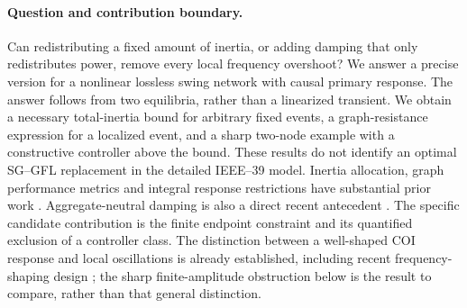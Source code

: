 \documentclass[11pt]{article}
\begin{document}
\paragraph{Question and contribution boundary.}
Can redistributing a fixed amount of inertia, or adding damping that only
redistributes power, remove every local frequency overshoot? We answer a
precise version for a nonlinear lossless swing network with causal primary
response. The answer follows from two equilibria, rather than a linearized
transient. We obtain a necessary total-inertia bound for arbitrary fixed
events, a graph-resistance expression for a localized event, and a sharp
two-node example with a constructive controller above the bound.
These results do not identify an optimal SG--GFL replacement in the detailed
IEEE--39 model. Inertia allocation, graph performance metrics and integral
response restrictions have substantial prior work
\cite{poollainertia,pagnier,malladamoments,aalipourmoments}.
Aggregate-neutral damping is also a direct recent antecedent
\cite{kohlhaas2026}. The specific candidate contribution is the finite
endpoint constraint and its quantified exclusion of a controller class.
The distinction between a well-shaped COI response and local oscillations
is already established, including recent frequency-shaping design
\cite{jiangfs}; the sharp finite-amplitude obstruction below is the result
to compare, rather than that general distinction.
\end{document}
